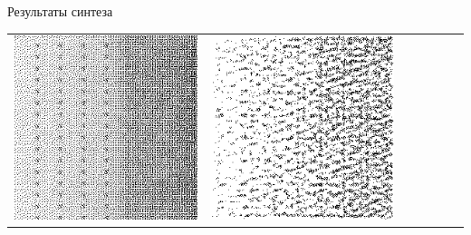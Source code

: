 \documentclass[12pt]{beamer}
\begin{document}
\begin{frame}{Результаты синтеза}
\begin{table}
\begin{center}
\begin{tabular}{p{1.2cm} p{1.2cm} p{1.2cm} p{1.2cm} p{1.2cm} p{1.2cm} p{1.2cm}}
					\includegraphics[width=1\linewidth]{8-results/sand-trend8/nf64e1/gen3}
					&
					\includegraphics[width=1\linewidth]{8-results/sand-trend8/nf64e5/gen3}
					&

\end{tabular}
\end{center}
\end{table}
\end{frame}
\end{document}
